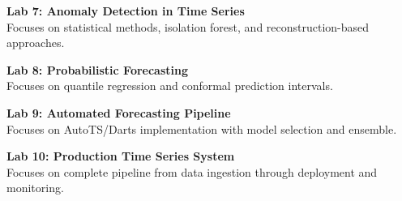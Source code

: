\vspace{0.2cm}

\noindent\textbf{Lab 7: Anomaly Detection in Time Series} \\
Focuses on statistical methods, isolation forest, and reconstruction-based approaches.

\vspace{0.2cm}

\noindent\textbf{Lab 8: Probabilistic Forecasting} \\
Focuses on quantile regression and conformal prediction intervals.

\vspace{0.2cm}

\noindent\textbf{Lab 9: Automated Forecasting Pipeline} \\
Focuses on AutoTS/Darts implementation with model selection and ensemble.

\vspace{0.2cm}

\noindent\textbf{Lab 10: Production Time Series System} \\
Focuses on complete pipeline from data ingestion through deployment and monitoring.

\vspace{0.2cm}

\newpage
{}
